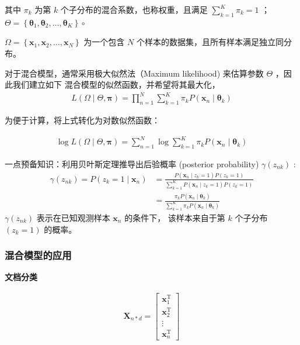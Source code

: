 \documentclass[UTF8]{ctexart}
\numberwithin{equation}{section}
\begin{document}
其中 $\pi_{k}$ 为第 $k$ 个子分布的混合系数，也称权重，且满足
$\sum_{k=1}^{K} \pi_{k}=1$ ； $\Theta=\left\{\boldsymbol{\theta}_{1}, \boldsymbol{\theta}_{2}, \ldots, \boldsymbol{\theta}_{K}\right\} \circ$

$\Omega=\left\{\boldsymbol{x}_{1}, \boldsymbol{x}_{2}, \ldots, \boldsymbol{x}_{N}\right\}$ 
为一个包含 $N$ 个样本的数据集，且所有样本满足独立同分布。

对于混合模型，通常采用极大似然法（Maximum likelihood) 来估算参数 $\Theta$ ，因此我们建立如下
混合模型的似然函数，并希望将其最大化，
$$
\begin{aligned}
L(\Omega \mid \Theta, \boldsymbol{\pi})=\prod_{n=1}^{N} \sum_{k=1}^{K} \pi_{k} P\left(\boldsymbol{x}_{n} \mid \boldsymbol{\theta}_{k}\right)
\end{aligned}
$$

为便于计算，将上式转化为对数似然函数：

$$
\begin{aligned}
\log L(\Omega \mid \Theta, \boldsymbol{\pi})=\sum_{n=1}^{N} \log \sum_{k=1}^{K} \pi_{k} P\left(\boldsymbol{x}_{n} \mid \boldsymbol{\theta}_{k}\right)
\end{aligned}
$$

一点预备知识：利用贝叶斯定理推导出后验概率 (posterior probability) 
$\gamma\left(z_{n k}\right)$ :
$$
\begin{aligned}
\gamma\left(z_{n k}\right)=P\left(z_{k}=1 \mid \boldsymbol{x}_{n}\right) &=\frac{P\left(\boldsymbol{x}_{n} \mid z_{k}=1\right) P\left(z_{k}=1\right)}{\sum_{k=1}^{K} P\left(\boldsymbol{x}_{n} \mid z_{k}=1\right) P\left(z_{k}=1\right)} \\
&=\frac{\pi_{k} P\left(\boldsymbol{x}_{n} \mid \boldsymbol{\theta}_{k}\right)}{\sum_{k=1}^{K} \pi_{k} P\left(\boldsymbol{x}_{n} \mid \boldsymbol{\theta}_{k}\right)}
\end{aligned}
$$
$\gamma\left(z_{n k}\right)$ 表示在已知观测样本 $\boldsymbol{x}_{n}$ 的条件下，
该样本来自于第 $k$ 个子分布 $\left(z_{k}=1\right)$ 的概率。

\subsubsection{混合模型的应用}

\textbf{文档分类} 


$$
\begin{aligned}
\boldsymbol{X}_{n*d}=\left[\begin{array}{c}
    \boldsymbol{x}_{1}^{\mathrm{T}} \\
    \boldsymbol{x}_{2}^{\mathrm{T}} \\
    \vdots \\
    \boldsymbol{x}_{n}^{\mathrm{T}}
    \end{array}\right]
\end{aligned}
$$
\end{document}
